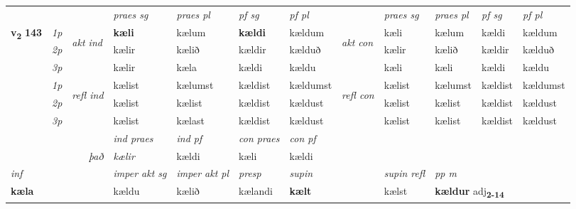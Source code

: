 \begin{longtable}[l]{X>{\footnotesize\itshape}llXXXXlXXXX}
 & &   & \textit{praes sg}  & \textit{praes pl}    & \textit{ pf sg} & \textit{pf pl} & & \textit{praes sg}  & \textit{praes pl}    & \textit{pf sg} & \textit{pf pl }  \\ \cmidrule{4-7} \cmidrule{9-12}
 \multirow{2}{*}{{{\textbf{v{\textsubscript{2}}} \Large{\textbf{143}}}}}  & 1p & \multirow{3}{*}{\begin{turn}{90}\textit{akt ind}\end{turn}} & \textbf{kæli} & kælum & \textbf{kældi} & kældum & \multirow{3}{*}{\begin{turn}{90}\textit{akt con}\end{turn}} &kæli & kælum & kældi & kældum\\*
 & 2p &  &  kælir  & kælið & kældir & kælduð & & kælir & kælið & kældir & kælduð \\*
 & 3p &  & kælir & kæla & kældi & kældu & & kæli & kæli& kældi & kældu \\*
\cmidrule{4-7} \cmidrule{9-12}
 & 1p & \multirow{3}{*}{\begin{turn}{90}\textit{refl ind}\end{turn}}  & kælist & kælumst & kældist & kældumst & \multirow{3}{*}{\begin{turn}{90}\textit{refl con}\end{turn}}  &kælist & kælumst & kældist & kældumst \\*
 & 2p &  & kælist & kælist & kældist & kældust & &kælist & kælist & kældist & kældust \\*
 & 3p  & & kælist & kælast & kældist & kældust & & kælist & kælist& kældist & kældust \\*
\cmidrule{4-7} \cmidrule{9-12}

   && &  \textit{ind praes} & \textit{ind pf} & \textit{con praes} & \textit{con pf} \\*
\multicolumn{3}{r}{\textit{það}} & kælir & kældi & kæli & kældi \\*

\cmidrule{4-7}
   {\textit{inf}} & &  & \textit{imper akt sg} & \textit{imper akt pl}   & \textit{presp} & \textit{supin} && \textit{supin refl} & \textit{pp m} \\*
  {\textbf{kæla}} & && kældu  & kælið   & kælandi &  \textbf{kælt} && kælst & \multicolumn{2}{l}{\textbf{kældur} adj\textbf{\textsubscript{2-14}}} \\*


\end{longtable}
